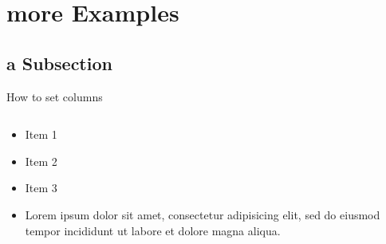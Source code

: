 \documentclass[]{beamer}
\begin{document}
\section{more Examples}

\subsection{a Subsection}

\begin{frame}{How to set columns}
  \begin{columns}[T]
    \begin{column}{.45\textwidth}
      \begin{itemize}
        \item Item 1
        \item Item 2
        \item Item 3
        \item Lorem ipsum dolor sit amet, consectetur adipisicing elit, sed do eiusmod tempor incididunt ut labore et dolore magna aliqua. 
      \end{itemize}
    \end{column}
    \begin{column}{.45\textwidth}

\end{column}
\end{columns}
\end{frame}
\end{document}
